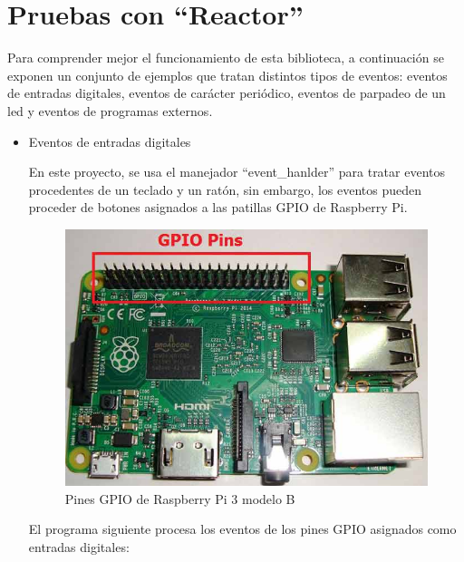 \appendix
\chapter{Pruebas con ``Reactor''} \label{anexoA}
\newpage

Para comprender mejor el funcionamiento de esta biblioteca, a continuación se exponen un conjunto de ejemplos que tratan distintos tipos de eventos: eventos de entradas digitales, eventos de carácter periódico, eventos de parpadeo de un led y eventos de programas externos.

\begin{itemize}
    \item Eventos de entradas digitales
    
    En este proyecto, se usa el manejador ``event\_hanlder'' para tratar eventos procedentes de un teclado y un ratón, sin embargo, los eventos pueden proceder de botones asignados a las patillas GPIO de Raspberry Pi. 
    
    \begin{figure}
    \centering
    \includegraphics[scale = 0.3]{anexo_a/figuras_dir/GPIO.jpg}
    \caption{Pines GPIO de Raspberry Pi 3 modelo B}
    \end{figure}
    
    El programa siguiente procesa los eventos de los pines GPIO asignados como entradas digitales:
    
\end{itemize}
